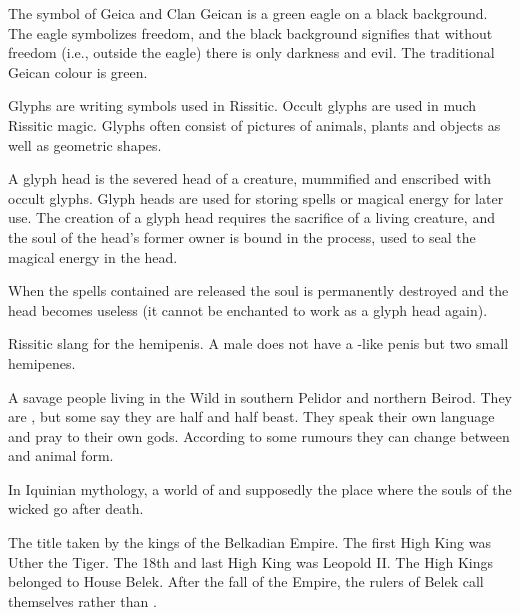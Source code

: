 \begin{gloss}
The symbol of Geica and Clan Geican is a green eagle on a black background. The eagle symbolizes freedom, and the black background signifies that without freedom (i.e., outside the eagle) there is only darkness and evil. The traditional Geican colour is green. 



Glyphs are writing symbols used in Rissitic. Occult glyphs are used in much Rissitic magic. Glyphs often consist of pictures of animals, plants and objects as well as geometric shapes.



A glyph head is the severed head of a creature, mummified and enscribed with occult glyphs. Glyph heads are used for storing spells or magical energy for later use. The creation of a glyph head requires the sacrifice of a living creature, and the soul of the head's former owner is bound in the process, used to seal the magical energy in the head. 

When the spells contained are released the soul is permanently destroyed and the head becomes useless (it cannot be enchanted to work as a glyph head again). 



Rissitic slang for the \scathaese{} hemipenis. A male \scatha{} does not have a \human{}-like penis but two small hemipenes. 



\gitempl{\Goyden}{\Goydens}
A savage people living in the Wild in southern Pelidor and northern Beirod. They are \humans, but some say they are half \human{} and half beast. They speak their own language and pray to their own gods. According to some rumours they can change between \human{} and animal form. 



\seee{\Dun{}}



\begin{comment}
\subsubsection{H-N}
\end{comment}

In Iquinian mythology, a world of \daemons{} and supposedly the place where the souls of the wicked go after death. 



The title taken by the kings of the Belkadian Empire. The first High King was Uther the Tiger. The 18th and last High King was Leopold II. The High Kings belonged to House Belek. %
After the fall of the Empire, the rulers of Belek call themselves  rather than . 


\end{gloss}
